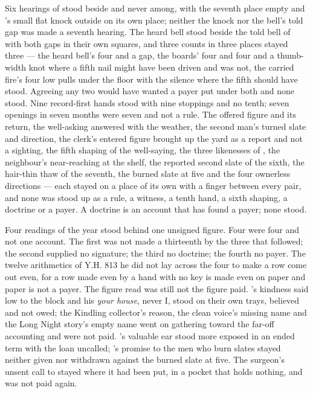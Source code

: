 Six hearings of  stood beside and never among, with the seventh place empty and 's small flat knock outside on its own place; neither the knock nor the bell's told gap was made a seventh hearing. The heard bell stood beside the told bell of  with both gaps in their own squares, and three counts in three places stayed three --- the heard bell's four and a gap, the boards' four and four and a thumb-width knot where a fifth nail might have been driven and was not, the carried fire's four low pulls under the floor with the silence where the fifth should have stood. Agreeing any two would have wanted a payer put under both and none stood. Nine record-first hands stood with nine stoppings and no tenth; seven openings in seven months were seven and not a rule. The offered figure and its return, the well-asking answered with the weather, the second man's turned slate and direction, the clerk's entered figure brought up the yard as a report and not a sighting, the fifth shaping of the well-saying, the three likenesses of , the neighbour's near-reaching at the shelf, the reported second slate of the sixth, the hair-thin thaw of the seventh, the burned slate at five and the four ownerless directions --- each stayed on a place of its own with a finger between every pair, and none was stood up as a rule, a witness, a tenth hand, a sixth shaping, a doctrine or a payer. A doctrine is an account that has found a payer; none stood.

Four readings of the year stood behind one unsigned figure. Four were four and not one account. The first was not made a thirteenth by the three that followed; the second supplied no signature; the third no doctrine; the fourth no payer. The twelve arithmetics of Y.H. 813 he did not lay across the four to make a row come out even, for a row made even by a hand with no key is made even on paper and paper is not a payer. The figure read was still not the figure paid. 's kindness said low to the block and his \emph{your house}, never I, stood on their own trays, believed and not owed; the Kindling collector's reason, the clean voice's missing name and the Long Night story's empty name went on gathering toward the far-off accounting and were not paid. 's valuable ear stood more exposed in an ended term with the loan uncalled; 's promise to the men who burn slates stayed neither given nor withdrawn against the burned slate at five. The surgeon's unsent call to  stayed where it had been put, in a pocket that holds nothing, and was not paid again.


